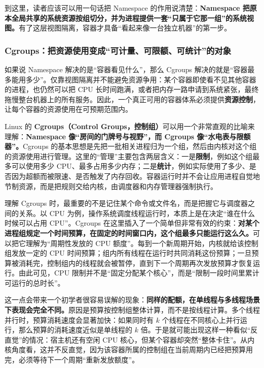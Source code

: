 到这里，读者应该可以用一句话把 Namespace 的作用说清楚：\textbf{Namespace 把原本全局共享的系统资源按组切分，并为进程提供一套“只属于它那一组”的系统视图。}有了这层视图隔离，容器才具备“看起来像一台独立机器”的第一步。

\subsubsection{Cgroups：把资源使用变成“可计量、可限额、可统计”的对象}

如果说 Namespace 解决的是“容器看见什么”，那么 Cgroups 解决的就是“容器最多能用多少”。仅靠视图隔离并不能避免资源争用：某个容器即使看不见其他容器的进程，也仍然可以把 CPU 长时间跑满，或者把内存一路申请到系统紧张，最终拖慢整台机器上的所有服务。因此，一个真正可用的容器体系必须提供\textbf{资源控制}，让每个容器的资源使用在可预期范围内。

Linux 的 \textbf{Cgroups（Control Groups，控制组）}可以用一个非常直观的比喻来理解：\textbf{Namespace 像“房间的门牌号与视野”，而 Cgroups 像“水电表与限额器”。}Cgroups 的基本思想是先把一批相关进程归为一个组，然后由内核对这个组的资源使用进行管理。这里的“管理”主要包含两层含义：一是\textbf{限制}，例如这个组最多可以使用多少 CPU、最多占用多少内存；二是\textbf{统计}，例如实际使用了多少、是否因为超额而被限速、是否触发了内存回收。容器运行时并不会让应用进程自觉地节制资源，而是把规则交给内核，由调度器和内存管理器强制执行。

理解 Cgroups 时，最重要的不是记住某个命令或文件名，而是把握它与调度器之间的关系。以 CPU 为例，操作系统调度线程运行时，本质上是在决定“谁在什么时候可以占用 CPU”。Cgroups 在这里插入了一个简单但非常有效的约束：\textbf{对某个进程组规定一个时间预算，在固定的时间窗口内，这个组最多只能运行这么久。}可以把它理解为“周期性发放的 CPU 额度”。每到一个新周期开始，内核就给该控制组发放一定的 CPU 时间预算；组内所有线程在运行时共同消耗这份预算；一旦预算被消耗完，控制组内的线程就会被暂停，直到下一个周期再次发放预算才恢复运行。由此可见，CPU 限制并不是“固定分配某个核心”，而是“限制一段时间里累计可运行的总时长”。

这一点会带来一个初学者很容易误解的现象：\textbf{同样的配额，在单线程与多线程场景下表现会完全不同。}原因是预算按控制组整体计算，而不是按线程计算。多个线程并行时，预算消耗速度会显著加快：如果同时有 $k$ 个线程在不同核心上并行运行，那么预算的消耗速度近似是单线程的 $k$ 倍。于是就可能出现这样一种看似“反直觉”的情况：宿主机还有空闲 CPU 核心，但某个容器却突然“整体卡住”。从内核角度看，这并不反直觉，因为该容器所属的控制组在当前周期内已经把预算用完，必须等待下一个周期“重新发放额度”。

